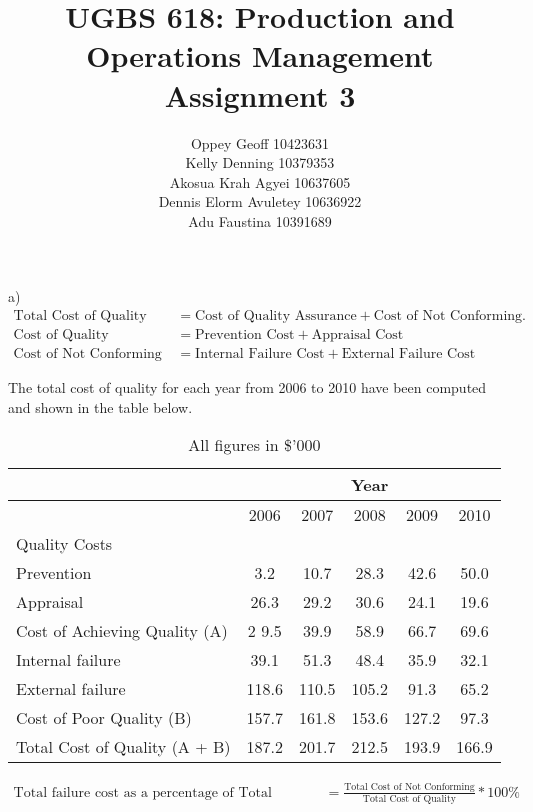 \documentclass[12pt]{article}
\title{UGBS 618: Production and Operations Management\\
	Assignment 3}
\author{Oppey Geoff 10423631 \\
	Kelly Denning 10379353\\
	Akosua Krah Agyei	10637605\\
	Dennis Elorm Avuletey    10636922\\
	Adu Faustina	10391689\\}
\date{}
\begin{document}
	\maketitle
	
	a)\begin{align*}
		\text{Total Cost of Quality} &= \text{Cost of Quality Assurance} + \text{Cost of Not Conforming}. \\
		\text{Cost of Quality Assurance} &= \text{Prevention Cost} + \text{Appraisal Cost} \\
		\text{Cost of Not Conforming} &= \text{Internal Failure Cost} + \text{External Failure Cost}
	\end{align*} 
	
	The total cost of quality for each year from 2006 to 2010 have been computed and shown in the table below.
	
	\begin{table}[h]
		\begin{center}
			\begin{tabular}{l|ccccc}
				\hline
				&\multicolumn{5}{c}{Year}  \\ 
				\hline
				&2006 & 2007 & 2008 & 2009 & 2010 \\
				\hline
				Quality Costs\\
				Prevention & 3.2 & 10.7 & 28.3 & 42.6 & 50.0 \\
				Appraisal & 26.3 & 29.2 & 30.6 & 24.1 & 19.6 \\
				\hline
				Cost of Achieving Quality (A) & 2 9.5 & 39.9 & 58.9 & 66.7 & 69.6\\
				\hline
				Internal failure & 39.1 & 51.3 & 48.4 & 35.9 & 32.1 \\
				External failure & 118.6 & 110.5 & 105.2 & 91.3 & 65.2 \\
				\hline
				Cost of Poor Quality (B) & 157.7 & 161.8 & 153.6 & 127.2 & 97.3 \\
				\hline
				Total Cost of Quality (A + B) & 187.2 & 201.7 & 212.5 & 193.9 & 166.9\\
				\hline
				\hline
			\end{tabular}
			\caption{All figures in \$'000}
		\end{center}
	\end{table}

\begin{align*}
	\text{Total failure cost as a percentage of Total Quality Costs} &= \frac{\text{Total Cost of Not Conforming}}{\text{Total Cost of Quality}} * 100\%
\end{align*}
\end{document}

